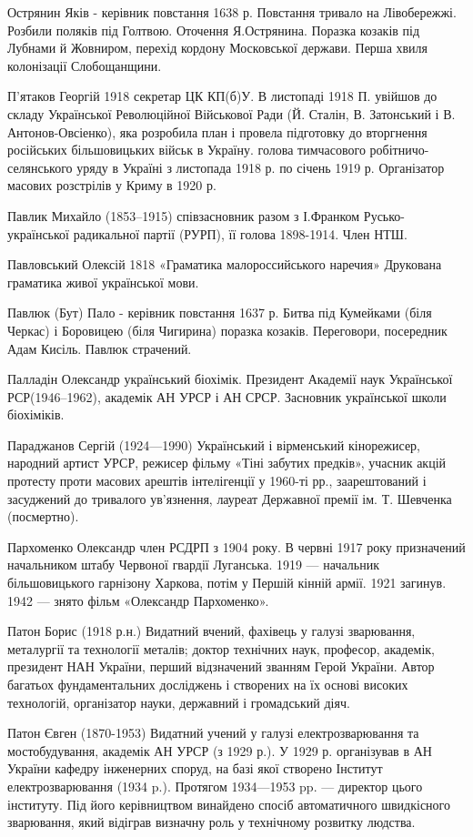 Острянин Яків  - керівник повстання 1638 р. Повстання тривало на Лівобережжі. Розбили поляків під Голтвою. Оточення Я.Острянина. Поразка козаків під Лубнами й Жовниром, перехід кордону Московської держави. Перша хвиля колонізації Слобощанщини.

П’ятаков Георгій 1918  секретар ЦК КП(б)У. В листопаді 1918 П. увійшов до складу Української Революційної Військової Ради (Й. Сталін, В. Затонський і В. Антонов-Овсіенко), яка розробила план і провела підготовку до вторгнення російських більшовицьких військ в Україну. голова тимчасового робітничо-селянського уряду в Україні з листопада 1918 р. по січень 1919 р. Організатор масових розстрілів у Криму в 1920 р. 

Павлик Михайло (1853–1915)  співзасновник разом з І.Франком Русько-української радикальної партії (РУРП), її голова 1898-1914. Член НТШ. 

Павловський Олексій 1818 «Граматика малороссийського наречия» Друкована граматика живої української мови.

Павлюк (Бут) Пало  - керівник повстання 1637 р. Битва під Кумейками (біля Черкас) і Боровицею (біля Чигирина) поразка козаків. Переговори, посередник Адам Кисіль. Павлюк страчений.

Палладін Олександр український біохімік. Президент Академії наук Української РСР(1946–1962), академік АН УРСР і АН СРСР. Засновник української школи біохіміків. 

Параджанов Сергій (1924—1990) Український і вірменський кінорежисер, народний артист УРСР, режисер фільму «Тіні забутих предків», учасник акцій протесту проти масових арештів інтелігенції у 1960-ті рр., заарештований і засуджений до тривалого ув’язнення, лауреат Державної премії ім. Т. Шевченка (посмертно).

Пархоменко Олександр член РСДРП з 1904 року. В червні 1917 року призначений начальником штабу Червоної гвардії Луганська. 1919 — начальник більшовицького гарнізону Харкова, потім у Першій кінній армії. 1921 загинув. 1942 — знято фільм «Олександр Пархоменко».

Патон Борис (1918 р.н.) Видатний вчений, фахівець у галузі зварювання, металургії та технології металів; доктор технічних наук, професор, академік, президент НАН України, перший відзначений званням Герой України. Автор багатьох фундаментальних досліджень і створених на їх основі високих технологій, організатор науки, державний і громадський діяч.

Патон Євген (1870-1953) Видатний учений у галузі електрозварювання та мостобудування, академік АН УРСР (з 1929 р.). У 1929 р. організував в АН України кафедру інженерних споруд, на базі якої створено Інститут електрозварювання (1934 p.). Протягом 1934—1953 pp. — директор цього інституту. Під його керівництвом винайдено спосіб автоматичного швидкісного зварювання, який відіграв визначну роль у технічному розвитку людства.

